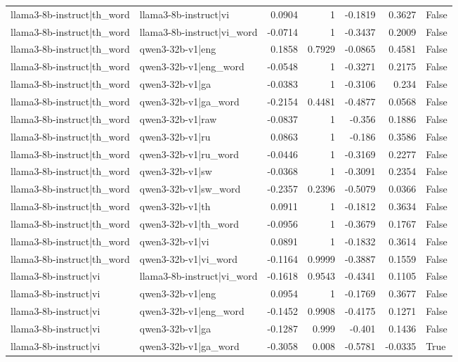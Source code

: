 \begin{table}
\begin{tabular}{l l r r r r l}
llama3-8b-instruct|th_word & llama3-8b-instruct|vi & 0.0904 & 1 & -0.1819 & 0.3627 & False \\
llama3-8b-instruct|th_word & llama3-8b-instruct|vi_word & -0.0714 & 1 & -0.3437 & 0.2009 & False \\
llama3-8b-instruct|th_word & qwen3-32b-v1|eng & 0.1858 & 0.7929 & -0.0865 & 0.4581 & False \\
llama3-8b-instruct|th_word & qwen3-32b-v1|eng_word & -0.0548 & 1 & -0.3271 & 0.2175 & False \\
llama3-8b-instruct|th_word & qwen3-32b-v1|ga & -0.0383 & 1 & -0.3106 & 0.234 & False \\
llama3-8b-instruct|th_word & qwen3-32b-v1|ga_word & -0.2154 & 0.4481 & -0.4877 & 0.0568 & False \\
llama3-8b-instruct|th_word & qwen3-32b-v1|raw & -0.0837 & 1 & -0.356 & 0.1886 & False \\
llama3-8b-instruct|th_word & qwen3-32b-v1|ru & 0.0863 & 1 & -0.186 & 0.3586 & False \\
llama3-8b-instruct|th_word & qwen3-32b-v1|ru_word & -0.0446 & 1 & -0.3169 & 0.2277 & False \\
llama3-8b-instruct|th_word & qwen3-32b-v1|sw & -0.0368 & 1 & -0.3091 & 0.2354 & False \\
llama3-8b-instruct|th_word & qwen3-32b-v1|sw_word & -0.2357 & 0.2396 & -0.5079 & 0.0366 & False \\
llama3-8b-instruct|th_word & qwen3-32b-v1|th & 0.0911 & 1 & -0.1812 & 0.3634 & False \\
llama3-8b-instruct|th_word & qwen3-32b-v1|th_word & -0.0956 & 1 & -0.3679 & 0.1767 & False \\
llama3-8b-instruct|th_word & qwen3-32b-v1|vi & 0.0891 & 1 & -0.1832 & 0.3614 & False \\
llama3-8b-instruct|th_word & qwen3-32b-v1|vi_word & -0.1164 & 0.9999 & -0.3887 & 0.1559 & False \\
llama3-8b-instruct|vi & llama3-8b-instruct|vi_word & -0.1618 & 0.9543 & -0.4341 & 0.1105 & False \\
llama3-8b-instruct|vi & qwen3-32b-v1|eng & 0.0954 & 1 & -0.1769 & 0.3677 & False \\
llama3-8b-instruct|vi & qwen3-32b-v1|eng_word & -0.1452 & 0.9908 & -0.4175 & 0.1271 & False \\
llama3-8b-instruct|vi & qwen3-32b-v1|ga & -0.1287 & 0.999 & -0.401 & 0.1436 & False \\
llama3-8b-instruct|vi & qwen3-32b-v1|ga_word & -0.3058 & 0.008 & -0.5781 & -0.0335 & True \\

\end{tabular}
\end{table}
